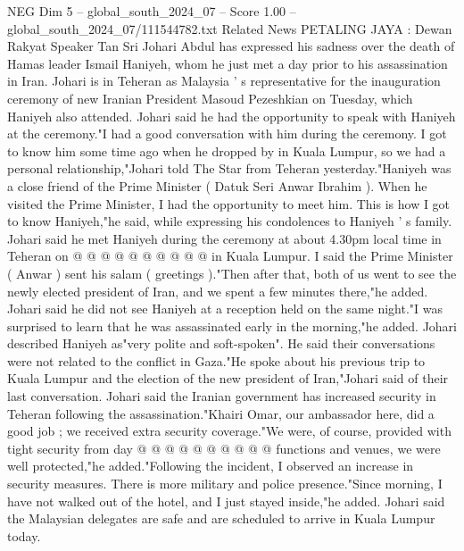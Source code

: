 \begin{textsample}{NEG Dim 5 – global\_south\_2024\_07 – Score 1.00 – global\_south\_2024\_07/111544782.txt}  \label{ex:f5_neg_297}
Related News PETALING JAYA : Dewan Rakyat Speaker Tan Sri Johari Abdul has expressed his sadness over the death of Hamas leader Ismail Haniyeh, whom he just met a day prior to his assassination in Iran.
Johari is in Teheran as Malaysia ' s representative for the inauguration ceremony of new Iranian President Masoud Pezeshkian on Tuesday, which Haniyeh also attended.
Johari said he had the opportunity to speak with Haniyeh at the ceremony."I had a good conversation with him during the ceremony.
I got to know him some time ago when he dropped by in Kuala Lumpur, so we had a personal relationship,"Johari told The Star from Teheran yesterday."Haniyeh was a close friend of the Prime Minister ( Datuk Seri Anwar Ibrahim ).
When he visited the Prime Minister, I had the opportunity to meet him.
This is how I got to know Haniyeh,"he said, while expressing his condolences to Haniyeh ' s family.
Johari said he met Haniyeh during the ceremony at about 4.30pm local time in Teheran on @ @ @ @ @ @ @ @ @ @ in Kuala Lumpur.
I said the Prime Minister ( Anwar ) sent his salam ( greetings )."Then after that, both of us went to see the newly elected president of Iran, and we spent a few minutes there,"he added.
Johari said he did not see Haniyeh at a reception held on the same night."I was surprised to learn that he was assassinated early in the morning,"he added.
Johari described Haniyeh as"very polite and soft-spoken".
He said their conversations were not related to the conflict in Gaza."He spoke about his previous trip to Kuala Lumpur and the election of the new president of Iran,"Johari said of their last conversation.
Johari said the Iranian government has increased security in Teheran following the assassination."Khairi Omar, our ambassador here, did a good job ; we received extra security coverage."We were, of course, provided with tight security from day @ @ @ @ @ @ @ @ @ @ functions and venues, we were well protected,"he added."Following the incident, I observed an increase in security measures.
There is more military and police presence."Since morning, I have not walked out of the hotel, and I just stayed inside,"he added.
Johari said the Malaysian delegates are safe and are scheduled to arrive in Kuala Lumpur today.

\end{textsample}

